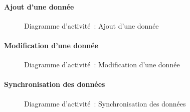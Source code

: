\newpage
\paragraph{Ajout d'une donnée}
\begin{bigcenter}
	\begin{figure}[h]
		\centering
		\scalebox{0.7}{}
		\caption{Diagramme d'activité~: Ajout d'une donnée}
		\label{SyncAddData}
	\end{figure}
\end{bigcenter}

\newpage
\paragraph{Modification d'une donnée}
\begin{bigcenter}
	\begin{figure}[h]
		\centering
		\scalebox{0.7}{}
		\caption{Diagramme d'activité~: Modification d'une donnée}
		\label{SyncModifData}
	\end{figure}
\end{bigcenter}

\newpage
\paragraph{Synchronisation des données}
\begin{bigcenter}
	\begin{figure}[h]
		\centering
		\scalebox{0.64}{}
		\caption{Diagramme d'activité~: Synchronisation des données}
		\label{SyncSynchronisation}
	\end{figure}
\end{bigcenter}
